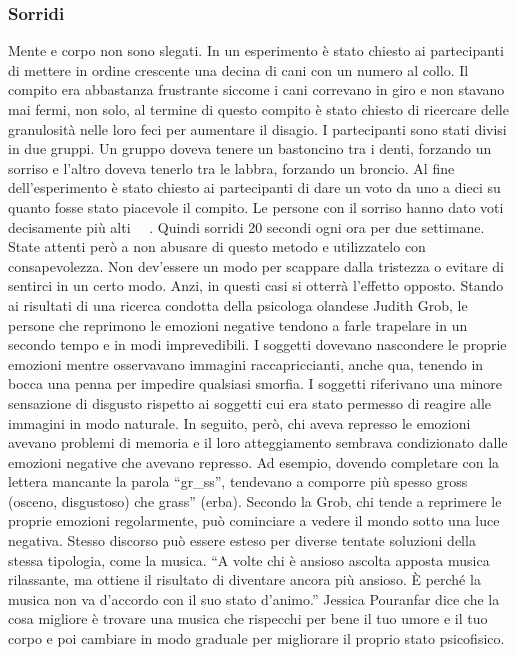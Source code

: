 \documentclass[12pt]{book} %
\begin{document}
\subsubsection{Sorridi}
Mente e corpo non sono slegati. In un esperimento è stato chiesto ai partecipanti di mettere in ordine crescente una
decina di cani con un numero al collo. Il compito era abbastanza frustrante siccome i cani correvano in giro e non
stavano mai fermi, non solo, al termine di questo compito è stato chiesto di ricercare delle granulosità nelle loro
feci per aumentare il disagio. I partecipanti sono stati divisi in due gruppi. Un gruppo doveva tenere un bastoncino
tra i denti, forzando un sorriso e l'altro doveva tenerlo tra le labbra, forzando un broncio. Al
fine dell'esperimento è stato chiesto ai partecipanti di dare un voto da uno a dieci su quanto
fosse stato piacevole il compito. Le persone con il sorriso hanno dato voti decisamente più
alti \ \ .
Quindi sorridi 20 secondi ogni ora per due settimane. State attenti però a non abusare di questo metodo e utilizzatelo
con consapevolezza. Non dev'essere un modo per scappare dalla tristezza o evitare di sentirci in
un certo modo. Anzi, in questi casi si otterrà l'effetto opposto. Stando ai risultati di una
ricerca condotta della psicologa olandese Judith Grob, le persone che reprimono le emozioni negative tendono a farle
trapelare in un secondo tempo e in modi imprevedibili. I soggetti dovevano nascondere le proprie emozioni mentre
osservavano immagini raccapriccianti, anche qua, tenendo in bocca una penna per impedire qualsiasi smorfia. I soggetti
riferivano una minore sensazione di disgusto rispetto ai soggetti cui era stato permesso di reagire alle immagini in
modo naturale. In seguito, però, chi aveva represso le emozioni avevano problemi di memoria e il loro atteggiamento
sembrava condizionato dalle emozioni negative che avevano represso. Ad esempio, dovendo completare con la lettera
mancante la parola “gr\_ss”, tendevano a comporre più spesso {\textquotedbl}gross{\textquotedbl} (osceno, disgustoso)
che {\textquotedbl}grass” (erba). Secondo la Grob, chi tende a reprimere le proprie emozioni regolarmente, può
cominciare a vedere il mondo sotto una luce negativa. Stesso discorso può essere esteso per diverse tentate soluzioni
della stessa tipologia, come la musica. “A volte chi è ansioso ascolta apposta musica rilassante, ma ottiene il
risultato di diventare ancora più ansioso. È perché la musica non va d'accordo con il suo stato
d'animo.” Jessica Pouranfar dice che la cosa migliore è trovare una musica che rispecchi per bene
il tuo umore e il tuo corpo e poi cambiare in modo graduale per migliorare il proprio stato
psicofisico. 
\end{document}
